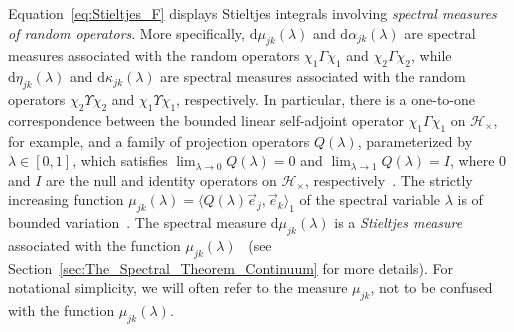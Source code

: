 \documentclass{cmslatex}
\renewcommand{\d}{\text{d}}
\begin{document}
Equation~\eqref{eq:Stieltjes_F} displays Stieltjes integrals involving
\emph{spectral measures of random operators}. More specifically,
$\d\mu_{jk}(\lambda)$ and $\d\alpha_{jk}(\lambda)$ are spectral measures associated 
with the random operators $\chi_1\Gamma\chi_1$ and $\chi_2\Gamma\chi_2$, while
$\d\eta_{jk}(\lambda)$ and $\d\kappa_{jk}(\lambda)$ are spectral measures associated
with the random operators $\chi_2\Upsilon\chi_2$ and $\chi_1\Upsilon\chi_1$, respectively. In
particular, there is a one-to-one correspondence between the bounded 
linear self-adjoint operator $\chi_1\Gamma\chi_1$ on $\mathscr{H}_\times$, for example, and a
family of projection operators $Q(\lambda)$, parameterized by $\lambda\in[0,1]$, which
satisfies $\lim_{\lambda\to0}Q(\lambda)=0$ and $\lim_{\lambda\to1}Q(\lambda)=I$, where $0$ and $I$
are the null and identity operators on $\mathscr{H}_\times$,
respectively~\cite{Stone:64}. The strictly increasing function 
$\mu_{jk}(\lambda)=\langle Q(\lambda)\vec{e}_j,\vec{e}_k\rangle_1$ of the spectral variable $\lambda$ is
of bounded variation~\cite{Stone:64}. The spectral measure
$\d\mu_{jk}(\lambda)$ is a \emph{Stieltjes measure}~\cite{Folland:99}
associated with the function $\mu_{jk}(\lambda)$~\cite{Stone:64} (see
Section~\ref{sec:The_Spectral_Theorem_Continuum} for more
details). For notational simplicity, we will often refer to the
measure $\mu_{jk}$, not to be confused with the function $\mu_{jk}(\lambda)$.  
\end{document}
